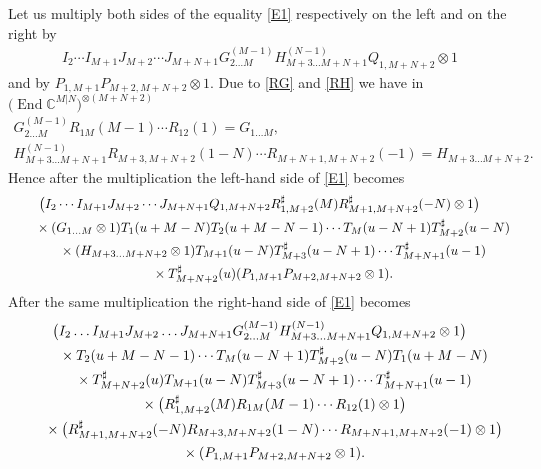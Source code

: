\documentclass[10pt,a4paper]{amsart}
\numberwithin{equation}{section}
\def\CC{{\mathbb{C}}}
\def\CMN{\CC^{M|N}}
\def\End{\operatorname{End}}
\def\ot{\otimes}
\def\RS{R^{\sharp}}
\def\TS{T^{\sharp}}
\begin{document}
Let us multiply both sides of the equality \eqref{E1}
respectively on the left and on the right by
\begin{gather*}
I_{2} \cdots I_{M+1}
J_{M+2} \cdots J_{M+N+1}
G_{2 \dots M}^{(M-1)} H_{M+3 \dots M+N+1}^{(N-1)}
Q_{1,M+N+2}\ot1
\end{gather*}
and by $P_{1,M+1} P_{M+2,M+N+2}\ot1 $.
Due to \eqref{RG} and \eqref{RH} we have in~$\big(\End\CMN\big)^{\ot (M+N+2)}$
\begin{gather}\label{GM}
 G_{2 \dots M}^{(M-1)} R_{1M} (M-1) \cdots R_{12} (1)=G_{1 \dots M} ,\\
\label{HN}
H_{M+3 \dots M+N+1}^{(N-1)}R_{M+3,M+N+2} (1-N) \cdots R_{M+N+1,M+N+2} (-1)= H_{M+3 \dots M+N+2} .
\end{gather}
Hence after the multiplication the left-hand side of \eqref{E1} becomes
\begin{gather}
\big( I_{2} \cdots I_{M+1}
J_{M+2} \cdots J_{M+N+1} Q_{1,M+N+2}
\RS_{1,M+2} (M )
\RS_{M+1,M+N+2} (-N )\ot1 \big)\notag\\
\qquad{}\times
( G_{1 \dots M}\ot1 )
T_1 (u+M-N) T_2 (u+M-N-1) \cdots T_{M} (u-N+1)
\TS_{M+2} (u-N)\notag
\\ \qquad{} \times
( H_{M+3 \dots M+N+2}\ot1 )
T_{M+1} (u-N)
\TS_{M+3} (u-N+1) \cdots \TS_{M+N+1} (u-1)\notag
\\ \qquad{} \times
\TS_{M+N+2} (u) ( P_{1,M+1} P_{M+2,M+N+2}\ot1 ) .\label{E2}
\end{gather}
After the same multiplication the right-hand side of \eqref{E1} becomes
\begin{gather}
 \big( I_{2} \dots I_{M+1}
J_{M+2} \dots J_{M+N+1}
G_{2 \dots M}^{(M-1)} H_{M+3 \dots M+N+1}^{(N-1)}
Q_{1,M+N+2}\ot1 \big)\notag
\\
\qquad{} \times T_2 (u+M-N-1) \cdots T_{M} (u-N+1)
\TS_{M+2} (u-N) T_1 (u+M-N)\notag
\\ \qquad{} \times \TS_{M+N+2} (u) T_{M+1} (u-N)
\TS_{M+3} (u-N+1) \cdots \TS_{M+N+1} (u-1)\notag\\
\qquad{} \times
\big( \RS_{1,M+2} (M )
R_{1M} (M-1) \cdots R_{12} (1)\ot1 \big)\notag
\\ \qquad{} \times
 \big( \RS_{M+1,M+N+2} (-N )
R_{M+3,M+N+2} (1-N) \cdots R_{M+N+1,M+N+2} (-1)\ot1 \big)\notag
\\ \qquad{} \times
( P_{1,M+1} P_{M+2,M+N+2}\ot1 ) . \label{E4}
\end{gather}
\end{document}
